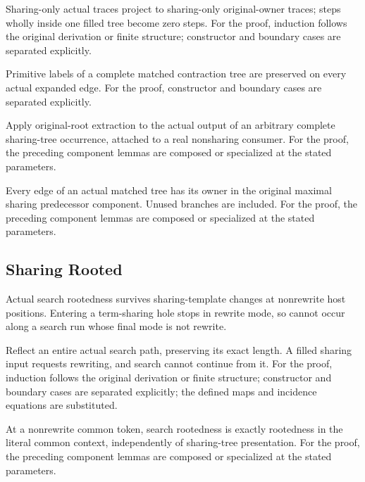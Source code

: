 Sharing-only actual traces project to sharing-only original-owner traces; steps wholly inside one filled tree become zero steps.
For the proof, induction follows the original derivation or finite structure; constructor and boundary cases are separated explicitly.
\par{}

Primitive labels of a complete matched contraction tree are preserved on every actual expanded edge.
For the proof, constructor and boundary cases are separated explicitly.
\par{}

Apply original-root extraction to the actual output of an arbitrary complete sharing-tree occurrence, attached to a real nonsharing consumer.
For the proof, the preceding component lemmas are composed or specialized at the stated parameters.
\par{}

Every edge of an actual matched tree has its owner in the original maximal sharing predecessor component. Unused branches are included.
For the proof, the preceding component lemmas are composed or specialized at the stated parameters.
\par{}

\subsection{Sharing Rooted}
Actual search rootedness survives sharing-template changes at nonrewrite host positions. Entering a term-sharing hole stops in rewrite mode, so cannot occur along a search run whose final mode is not rewrite.

Reflect an entire actual search path, preserving its exact length. A filled sharing input requests rewriting, and search cannot continue from it.
For the proof, induction follows the original derivation or finite structure; constructor and boundary cases are separated explicitly; the defined maps and incidence equations are substituted.
\par{}

At a nonrewrite common token, search rootedness is exactly rootedness in the literal common context, independently of sharing-tree presentation.
For the proof, the preceding component lemmas are composed or specialized at the stated parameters.
\par{}

